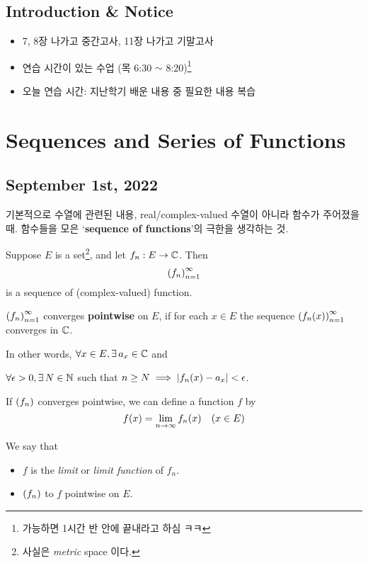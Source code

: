 \section*{Introduction \& Notice}

\begin{itemize}
    \item 7, 8장 나가고 중간고사, 11장 나가고 기말고사
    \item 연습 시간이 있는 수업 (목 6:30 \(\sim\) 8:20)\footnote{가능하면 1시간 반 안에 끝내라고 하심 ㅋㅋ}
    \item 오늘 연습 시간: 지난학기 배운 내용 중 필요한 내용 복습
\end{itemize}

\chapter{Sequences and Series of Functions}

\section*{September 1st, 2022}

기본적으로 수열에 관련된 내용, real/complex-valued 수열이 아니라 함수가 주어졌을 때. 함수들을 모은 `\textbf{sequence of functions}'의 극한을 생각하는 것.

\medskip

Suppose \(E\) is a set\footnote{사실은 \textit{metric} space 이다.}, and let \(f_n: E \rightarrow \mathbb{C}\). Then
\[
    \left( f_n \right)_{n=1}^\infty
\]
is a sequence of (complex-valued) function.

\begin{defn}[7.1]
    \(\left( f_n \right)_{n = 1}^\infty\) converges \textbf{pointwise} on \(E\), if for each \(x \in E\) the sequence \(\left( f_n(x) \right)_{n=1}^\infty\) converges in \(\mathbb{C}\).

    In other words, \(\forall x \in E, \exists a_x \in \C\) and
    \begin{center}
        \(\forall \epsilon > 0, \exists N \in \N\) such that \(n \geq N \implies \left|f_n(x) - a_x\right| < \epsilon\).
    \end{center}
\end{defn}

\begin{defn}
    If \(\left( f_n \right)\) converges pointwise, we can define a function \(f\) by
    \[
        f(x) = \lim_{n \rightarrow \infty} f_n(x) \quad (x\in E)
    \]

    We say that
    \begin{itemize}
        \item \(f\) is the \textit{limit} or \textit{limit function} of \(f_n\).
        \item \(\left( f_n \right)\) to \(f\) pointwise on \(E\).
    \end{itemize}
\end{defn}

